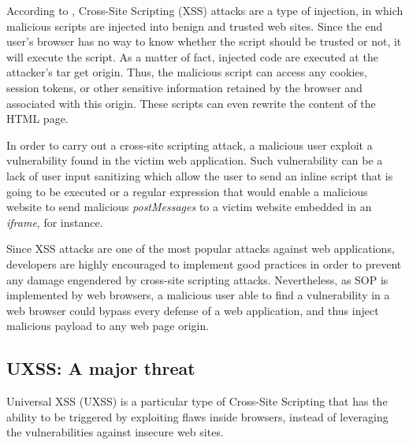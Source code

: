 \documentclass[journal]{IEEEtran}
\begin{document}
According to \cite{owaspXSS}, Cross-Site Scripting (XSS) attacks are a type of injection, in which malicious scripts are injected into benign and trusted web sites.
Since the end user’s browser has no way to know whether the script should be trusted or not, it will execute the script. As a matter of fact, injected code are executed at the attacker’s tar get origin. Thus, the malicious script can access any cookies, session tokens, or other sensitive information retained by the browser and associated with this origin. These scripts can even rewrite the content of the HTML page.

\bigskip


\bigskip

In order to carry out a cross-site scripting attack, a malicious user exploit a vulnerability found in the victim web application. Such vulnerability can be a lack of user input sanitizing which allow the user to send an inline script that is going to be executed or a regular expression that would enable a malicious website to send malicious \emph{postMessages}  \cite{postMessagesXSS} to a victim website embedded in an \emph{iframe}, for instance. 

\medskip

Since XSS attacks are one of the most popular attacks against web applications, developers are highly encouraged to implement good practices in order to prevent any damage engendered by cross-site scripting attacks. Nevertheless, as SOP is implemented by web browsers, a malicious user able to find a vulnerability in a web browser could bypass every defense of a web application, and thus inject malicious payload to any web page origin.

\subsection{UXSS: A major threat}

Universal XSS (UXSS) is a particular type of Cross-Site Scripting that has the ability to be triggered by exploiting flaws inside browsers, instead of leveraging the vulnerabilities against insecure web sites.

\bigskip

\end{document}
